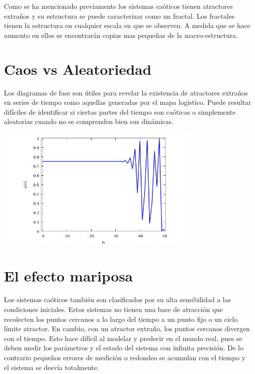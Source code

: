 \documentclass{article} %
\begin{document}
Como se ha mencionado previamente los sistemas caóticos tienen atractores extraños y su estructura se puede caracterizar como un fractal. Los fractales tienen la estructura en cualquier escala en que se observen. A medida que se hace aumento en ellos se encontrarán copias mas pequeñas de la macro-estructura. 


\section*{Caos vs Aleatoriedad}

Los diagramas de fase son útiles para revelar la existencia de atractores extraños en series de tiempo como aquellas generadas por el mapa logístico. Puede resultar difíciles de identificar si ciertas partes del tiempo son caóticas o simplemente aleatorias cuando no se comprenden bien sus dinámicas. 

\begin{center}

	\includegraphics[width=10cm]{7.png}
    
\end{center}


\section*{El efecto mariposa}

Los sistemas caóticos también son clasificados por su alta sensibilidad a las condiciones iniciales. Estos sistemas no tienen una base de atracción que recolecten los puntos cercanos a lo largo del tiempo a un punto fijo o un ciclo límite atractor. En cambio, con un atractor extraño, los puntos cercanos divergen con el tiempo. Esto hace difícil al modelar y predecir en el mundo real, pues se deben medir los parámetros y el estado del sistema con infinita precisión. De lo contrario pequeños errores de medición o redondeo se acumulan con el tiempo y el sistema se desvía totalmente. 
\end{document}
